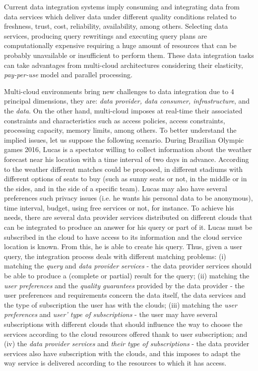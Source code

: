 Current data integration systems imply consuming and integrating data from data services which deliver data under different quality conditions related to freshness, trust, cost, reliability, availability, among others. Selecting data services, producing query rewritings and executing query plans are computationally expensive requiring a huge amount of resources that can be probably unavailable or insufficient to perform them. These data integration tasks can take advantages from multi-cloud architectures considering their elasticity, \textit{pay-per-use} model and parallel processing.

Multi-cloud environments bring new challenges to data integration due to 4 principal dimensions, they are: \textit{data provider, data consumer, infrastructure}, and the \textit{data}. On the other hand, multi-cloud imposes at
real-time their associated constraints and characteristics such as access policies, access constraints,
processing capacity, memory limits, among others. 
%
To better understand the implied issues, let us suppose the following scenario. 
During Brazilian Olympic games 2016, Lucas is a spectator willing to collect information about the weather forecast near his  location with a time interval of two days in advance. According to the weather different matches could be proposed, in different stadiums with different options of seats to buy (such as sunny seats or not, in the middle or in the sides, and in the side of a specific team).
%
Lucas may also have several preferences such privacy issues (i.e. he wants his personal data to be anonymous), time interval, budget, using free services or not, for instance. 
%
To achieve his needs, there are several data provider services distributed on
different clouds that can be integrated to produce an answer for his query or
part of it. Lucas must be subscribed in the cloud to have access to its
information and the cloud service location is known. From this, he
is able to create his query.
%
Thus, given a user query, the integration process deals with different matching problems: 
(i) matching the \textit{query} and \textit{data provider services} - the data provider services should be able to produce a (complete or partial) result for the query; 
(ii) matching the \textit{user preferences} and the \textit{quality guarantees} provided by the data provider - the user preferences and requirements concern the data itself, the data services and the type of subscription the user has with the clouds; 
(iii) matching the \textit{user preferences} and \textit{user' type of subscriptions} - the user may have several subscriptions with different clouds that should influence the way to choose the services according to the cloud resources offered thank to user subscription; and 
(iv) the \textit{data provider services} and \textit{their type of subscriptions} - the data provider services also have  subscription with the clouds, and this imposes to adapt the way service is delivered according to the resources to which it has access.


